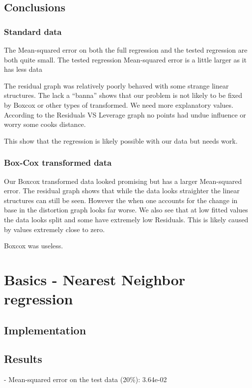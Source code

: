 \documentclass[12pt,a4paper]{article}
\begin{document}
\begin{singlespace}
\subsection{Conclusions}
\subsubsection{Standard data}
The Mean-squared error on both the full regression 
and the tested regression are both quite small. 
The tested regression Mean-squared error is a little larger as it has less data

The residual graph was relatively poorly behaved with some strange linear structures.
The lack a ``banna'' shows that our problem is not likely to be fixed by Boxcox or other types of transformed. We need more explanatory values.
According to the Residuals VS Leverage graph no points had undue influence
or worry some cooks distance.

This show that the regression is likely possible with our data but needs work.


\subsubsection{Box-Cox transformed data}
Our Boxcox transformed data looked promising but has a larger Mean-squared error.
The residual graph shows that while the data looks straighter the linear structures can still be seen.
However the when one accounts for the change in base in the distortion graph looks far worse. We also see that at low fitted values the data looks split and some have extremely low Residuals. This is likely caused by values extremely close to zero.

Boxcox was useless. 

\section{Basics - Nearest Neighbor regression}
\subsection{Implementation}


\subsection{Results}

- Mean-squared error on the test data (20\%): 3.64e-02



\end{singlespace}
\end{document}
